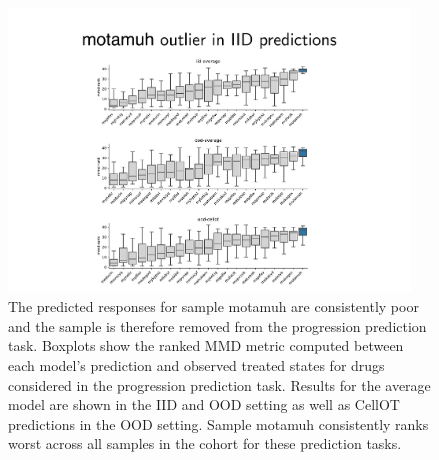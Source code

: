 \begin{figure}
  \begin{center}
    \includegraphics[width=0.95\textwidth]{figures/cellot-cohort/progression-exclude-motamuh.pdf}
  \end{center}
  \caption{
    The predicted responses for sample motamuh are consistently poor and the sample is therefore removed from the progression prediction task.
    Boxplots show the ranked MMD metric computed between each model's prediction and observed treated states for drugs considered in the progression prediction task.
    Results for the average model are shown in the IID and OOD setting as well as CellOT predictions in the OOD setting.
    Sample motamuh consistently ranks worst across all samples in the cohort for these prediction tasks.
  }\label{fig:progression-exclude-motamuh}
\end{figure}

